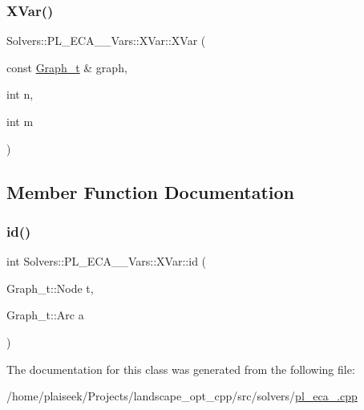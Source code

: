 \subsubsection{\texorpdfstring{X\+Var()}{XVar()}}
{\footnotesize\ttfamily Solvers\+::\+P\+L\+\_\+\+E\+C\+A\+\_\+\_\+\+Vars\+::\+X\+Var\+::\+X\+Var (\begin{DoxyParamCaption}\item[{const \hyperlink{pl__reff_8cpp_a65aea14f39d53b24df9910d54216d620}{Graph\+\_\+t} \&}]{graph,  }\item[{int}]{n,  }\item[{int}]{m }\end{DoxyParamCaption})\hspace{0.3cm}{\ttfamily [inline]}}



\subsection{Member Function Documentation}
\mbox{\label{class_solvers_1_1_p_l___e_c_a__2___vars_1_1_x_var_a8fd7e459e708180210c32e3e53f8f190}} 
\subsubsection{\texorpdfstring{id()}{id()}}
{\footnotesize\ttfamily int Solvers\+::\+P\+L\+\_\+\+E\+C\+A\+\_\+\_\+\+Vars\+::\+X\+Var\+::id (\begin{DoxyParamCaption}\item[{Graph\+\_\+t\+::\+Node}]{t,  }\item[{Graph\+\_\+t\+::\+Arc}]{a }\end{DoxyParamCaption})\hspace{0.3cm}{\ttfamily [inline]}}



The documentation for this class was generated from the following file\+:\begin{DoxyCompactItemize}
\item 
/home/plaiseek/\+Projects/landscape\+\_\+opt\+\_\+cpp/src/solvers/\hyperlink{pl__eca__2_8cpp}{pl\+\_\+eca\+\_.\+cpp}\end{DoxyCompactItemize}
